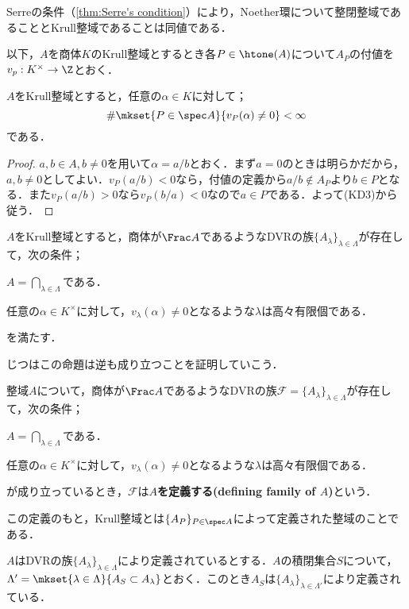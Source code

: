 Serreの条件（\ref{thm:Serre's condition}）により，Noether環について整閉整域であることとKrull整域であることは同値である．

以下，$A$を商体$K$のKrull整域とするとき各$P\in\htone(A)$について$A_P$の付値を$v_p:K^\times\to\Z$とおく．

\begin{prop}
	$A$をKrull整域とすると，任意の$\alpha\in K$に対して；
	\[\#\mkset{P\in\spec A}{v_P(\alpha)\neq0}<\infty\]
	である．
\end{prop}

\begin{proof}
	$a,b\in A,b\neq 0$を用いて$\alpha=a/b$とおく．まず$a=0$のときは明らかだから，$a,b\neq 0$としてよい．$v_P(a/b)<0$なら，付値の定義から$a/b\not\in A_P$より$b\in P$となる．また$v_P(a/b)>0$なら$v_P(b/a)<0$なので$a\in P$である．よって(KD3)から従う．
\end{proof}

\begin{cor}
	$A$をKrull整域とすると，商体が$\Frac A$であるようなDVRの族$\{A_\lambda\}_{\lambda\in\Lambda}$が存在して，次の条件；
	\begin{sakura}
		\item $A=\bigcap_{\lambda\in\Lambda}$である．
		\item 任意の$\alpha\in K^\times$に対して，$v_\lambda(\alpha)\neq 0$となるような$\lambda$は高々有限個である．
	\end{sakura}
	を満たす．
\end{cor}

じつはこの命題は逆も成り立つことを証明していこう．

\begin{defi}
	整域$A$について，商体が$\Frac A$であるようなDVRの族$\mathscr{F}=\{A_\lambda\}_{\lambda\in\Lambda}$が存在して，次の条件；
	\begin{sakura}
		\item $A=\bigcap_{\lambda\in\Lambda}$である．
		\item 任意の$\alpha\in K^\times$に対して，$v_\lambda(\alpha)\neq 0$となるような$\lambda$は高々有限個である．
	\end{sakura}
	が成り立っているとき，$\mathscr{F}$は\textbf{$A$を定義する(defining family of $A$)}という．
\end{defi}

この定義のもと，Krull整域とは$\{A_P\}_{P\in\spec A}$によって定義された整域のことである．

\begin{prop}
	$A$はDVRの族$\{A_\lambda\}_{\lambda\in\Lambda}$により定義されているとする．$A$の積閉集合$S$について，$\Lambda'=\mkset{\lambda\in\Lambda}{A_S\subset A_\lambda}$とおく．このとき$A_S$は$\{A_\lambda\}_{\lambda\in\Lambda'}$により定義されている．
\end{prop}

